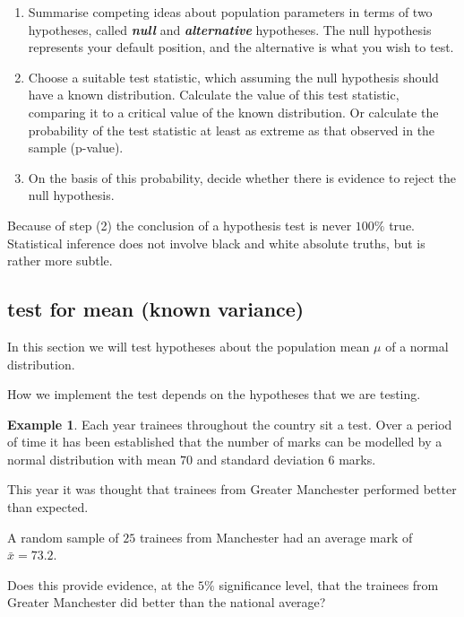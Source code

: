 \documentclass[
]{book}
\theoremstyle{definition}
\theoremstyle{definition}
\newtheorem{example}{Example}[chapter]
\theoremstyle{definition}
\theoremstyle{definition}
\theoremstyle{remark}
\begin{document}
\begin{enumerate}
\def\labelenumi{\arabic{enumi})}
\item
  Summarise competing ideas about population parameters in terms of two hypotheses, called \textbf{\emph{null}} and \textbf{\emph{alternative}} hypotheses. The null hypothesis represents your default position, and the alternative is what you wish to test.
\item
  Choose a suitable test statistic, which assuming the null hypothesis should have a known distribution. Calculate the value of this test statistic, comparing it to a critical value of the known distribution. Or calculate the probability of the test statistic at least as extreme as that observed in the sample (p-value).
\item
  On the basis of this probability, decide whether there is evidence to reject the null hypothesis.
\end{enumerate}

Because of step (2) the conclusion of a hypothesis test is never \(100\%\) true. Statistical inference does not involve black and white absolute truths, but is rather more subtle.

\hypertarget{test-for-mean-known-variance}{%
\subsection{test for mean (known variance)}\label{test-for-mean-known-variance}}

In this section we will test hypotheses about the population mean \(\mu\) of a normal distribution.

How we implement the test depends on the hypotheses that we are testing.

\begin{example}
Each year trainees throughout the country sit a test. Over a period of time it has been established that the number of marks can be modelled by a normal distribution with mean \(70\) and standard deviation \(6\) marks.

This year it was thought that trainees from Greater Manchester performed better than expected.

A random sample of \(25\) trainees from Manchester had an average mark of \(\bar{x}=73.2\).

Does this provide evidence, at the \(5\%\) significance level, that the trainees from Greater Manchester did better than the national average?
\end{example}
\end{document}
